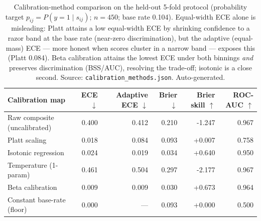 \begin{table}[!t]
\centering
\caption{Calibration-method comparison on the held-out 5-fold protocol (probability target $p_{ij}=P(y{=}1\mid s_{ij})$; $n{=}450$; base rate 0.104). Equal-width ECE alone is misleading: Platt attains a low equal-width ECE by shrinking confidence to a razor band at the base rate (near-zero discrimination), but the adaptive (equal-mass) ECE --- more honest when scores cluster in a narrow band --- exposes this (Platt 0.084). Beta calibration \citep{kull2017beta} attains the lowest ECE under both binnings \emph{and} preserves discrimination (BSS/AUC), resolving the trade-off; isotonic is a close second. Source: \texttt{calibration\_methods.json}. Auto-generated.}
\label{tab:calibration}
\begin{tabular}{@{}lrrrrr@{}}
\toprule
Calibration map & ECE $\downarrow$ & Adaptive ECE $\downarrow$ & Brier $\downarrow$ & Brier skill $\uparrow$ & ROC-AUC $\uparrow$ \\
\midrule
Raw composite (uncalibrated) & 0.400 & 0.412 & 0.210 & -1.247 & 0.967 \\
Platt scaling & 0.018 & 0.084 & 0.093 & +0.007 & 0.758 \\
Isotonic regression & 0.024 & 0.019 & 0.034 & +0.640 & 0.950 \\
Temperature (1-param) & 0.461 & 0.504 & 0.297 & -2.177 & 0.967 \\
Beta calibration & 0.009 & 0.009 & 0.030 & +0.673 & 0.964 \\
Constant base-rate (floor) & 0.000 & --- & 0.093 & +0.000 & 0.500 \\
\bottomrule
\end{tabular}
\end{table}

